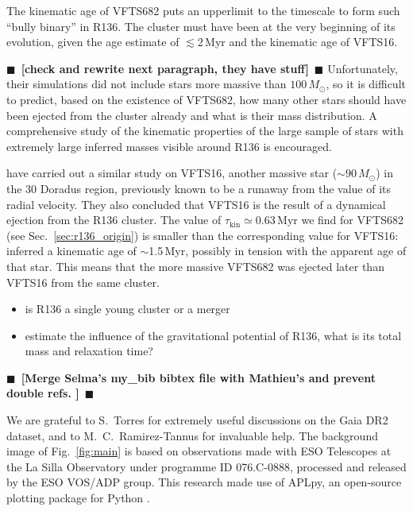 \documentclass[apjl,twocolumn]{emulateapj}
\newcommand{\todo}[1]{{\large $\blacksquare$~\textbf{\color{red}[#1]}}~$\blacksquare$}
\DeclareRobustCommand{\Figref}[1]{Fig.~\ref{#1}}
\DeclareRobustCommand{\Secref}[1]{Sec.~\ref{#1}}
\begin{document}
The kinematic age of VFTS682 puts an
upperlimit to the timescale to form such ``bully binary'' in
R136. The cluster must have been at the very beginning of its
evolution, given the age estimate of $\lesssim 2$\,Myr
\cite{crowther:10,sabbi:12} and the kinematic age of VFTS16.

\todo{check \cite{banerjee} and rewrite next paragraph, they
  have stuff} Unfortunately, their simulations did not include stars more
massive than $100\,M_\odot$, so it is difficult to predict, based on
the existence of VFTS682, how many other stars should have been
ejected from the cluster already and what is their mass
distribution. A comprehensive study of the kinematic properties of the
large sample of stars with extremely large inferred masses visible
around R136 is encouraged.  

\cite{lennon:18} have carried out a similar study on VFTS16, another
massive star ($\sim90\,M_\odot$) in the 30 Doradus region, previously
known to be a runaway from the value of
its radial velocity. They also concluded that VFTS16 is 
the result of a dynamical ejection from the R136 cluster. 
The value of $\tau_\mathrm{kin}\simeq0.63$\,Myr we find for VFTS682 (see \Secref{sec:r136_origin}) is smaller
than the corresponding value for VFTS16: \cite{lennon:18} inferred a kinematic age of
$\sim$1.5\,Myr, possibly in tension with the apparent age of that star. This means that the more
massive VFTS682 was ejected later than VFTS16 from the same cluster.



\begin{itemize}
\item is R136 a single young cluster or a merger
\item estimate the influence of the gravitational potential of R136,
  what is its total mass and relaxation time?
\end{itemize}


\todo{Merge Selma's my\_bib bibtex file with Mathieu's and prevent double refs. }



\begin{acknowledgements}
  We are grateful to S.~Torres for extremely useful discussions on the
  Gaia DR2 dataset, and to M.~C.~Ramirez-Tannus for invaluable help.
  The background image of \Figref{fig:main} is based on observations
  made with ESO Telescopes at the La Silla Observatory under programme
  ID 076.C-0888, processed and released by the ESO VOS/ADP group.
  This research made use of APLpy, an open-source plotting package for Python \citep[][]{robitaille:12}.
\end{acknowledgements}
\end{document}
